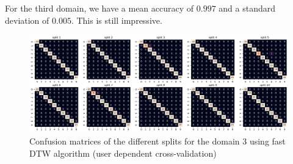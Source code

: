 For the third domain, we have a mean accuracy of $0.997$ and a standard deviation of $0.005$. This is still impressive.

\begin{figure}[H]
	\centering
	\includegraphics{figures/dtw/domain03/cm_dtw_d3_udep.png}
	\caption{Confusion matrices of the different splits for the domain 3 using fast DTW algorithm (user dependent cross-validation)}
	\label{fig:cm-dtw-d3-udep}
\end{figure}